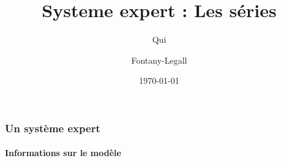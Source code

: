 \documentclass[11pt]{beamer}
\author{Qui \and Fontany-Legall}
\title{Systeme expert : Les séries}
\institute{Université de Nice}
\date{\today}
\begin{document}
\begin{frame}

\titlepage
\end{frame}

\begin{frame}
\frametitle{Un système expert}
\framesubtitle {Informations sur le modèle}

\end{frame}
\end{document}

